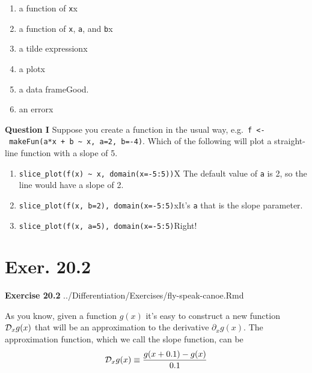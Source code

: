 \documentclass[
  letterpaper,
  DIV=11,
  numbers=noendperiod,
  oneside]{article}
\providecommand{\tightlist}{%
  \setlength{\itemsep}{0pt}\setlength{\parskip}{0pt}}\usepackage{longtable,booktabs,array}
\begin{document}
\begin{multicols}{2}
\begin{enumerate}
\def\labelenumi{\roman{enumi}.}
\tightlist
\item
  {a function of \texttt{x}{x}}\\
\item
  {a function of \texttt{x}, \texttt{a}, and \texttt{b}{x}}\\
\item
  {a tilde expression{x}}\\
\item
  {a plot{x}}\\
\item
  {a data frame{Good.~}}\\
\item
  {an error{x}}
\end{enumerate}

\textbf{Question I} Suppose you create a function in the usual way,
e.g.~\texttt{f\ \textless{}-\ makeFun(a*x\ +\ b\ \textasciitilde{}\ x,\ a=2,\ b=-4)}.
Which of the following will plot a straight-line function with a slope
of 5.

\begin{enumerate}
\def\labelenumi{\roman{enumi}.}
\tightlist
\item
  {\texttt{slice\_plot(f(x)\ \textasciitilde{}\ x,\ domain(x=-5:5))}{︎X
  The default value of \texttt{a} is 2, so the line would have a slope
  of 2.}}\\
\item
  {\texttt{slice\_plot(f(x,\ b=2),\ domain(x=-5:5)}{xIt's \texttt{a}
  that is the slope parameter.}}\\
\item
  {\texttt{slice\_plot(f(x,\ a=5),\ domain(x=-5:5)}{Right!~}}
\end{enumerate}

\hypertarget{exer.-20.2}{%
\section*{Exer. 20.2}\label{exer.-20.2}}

\textbf{Exercise 20.2} ../Differentiation/Exercises/fly-speak-canoe.Rmd

As you know, given a function \(g(x)\) it's easy to construct a new
function \({\cal D}_x g(x)\) that will be an approximation to the
derivative \(\partial_x g(x)\). The approximation function, which we
call the slope function, can be
\[{\cal D}_x g(x) \equiv \frac{g(x + 0.1) - g(x)}{0.1}\]


\end{multicols}
\end{document}
